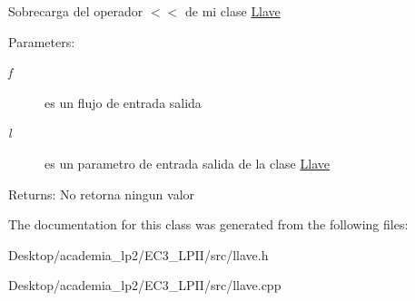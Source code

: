 Sobrecarga del operador $<$$<$ de mi clase \hyperlink{classLlave}{Llave} \begin{Desc}
\item[Parameters:]
\begin{description}
\item[{\em f}]es un flujo de entrada salida \item[{\em l}]es un parametro de entrada salida de la clase \hyperlink{classLlave}{Llave} \end{description}
\end{Desc}
\begin{Desc}
\item[Returns:]No retorna ningun valor \end{Desc}


The documentation for this class was generated from the following files:\begin{CompactItemize}
\item 
Desktop/academia\_\-lp2/EC3\_\-LPII/src/llave.h\item 
Desktop/academia\_\-lp2/EC3\_\-LPII/src/llave.cpp\end{CompactItemize}

